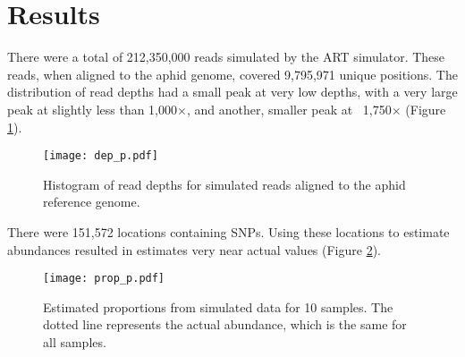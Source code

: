 
\section{Results}

There were a total of 212,350,000 reads simulated by the ART simulator.
These reads, when aligned to the aphid genome, covered 9,795,971 unique positions.
The distribution of read depths had a small peak at very low depths, with a very large
peak at slightly less than 1,000$\times$, and another, smaller peak at ~1,750$\times$
(Figure \ref{fig:depth}).

\begin{figure}[!ht]
    \centering
    \texttt{[image: dep\_p.pdf]}
    \caption{Histogram of read depths for simulated reads aligned to the aphid reference
        genome.}
    \label{fig:depth}
\end{figure}

There were 151,572 locations containing SNPs. Using these locations to estimate 
abundances resulted in estimates very near actual values (Figure \ref{fig:proportions}).

\begin{figure}[!ht]
    \centering
    \texttt{[image: prop\_p.pdf]}
    \caption{Estimated proportions from simulated data for 10 samples.
             The dotted line represents the actual abundance, which is the same for 
             all samples.}
    \label{fig:proportions}
\end{figure}

